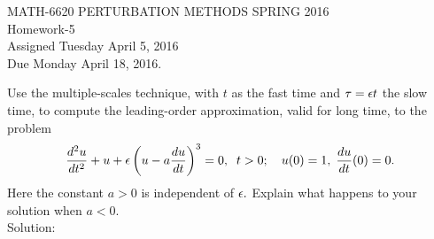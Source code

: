
\pagestyle{empty}


\begin{center}
\large{ MATH-6620 \hspace{1in}  PERTURBATION METHODS \hspace{1in}SPRING 2016\\ Homework-5 \\ Assigned Tuesday April 5, 2016 \\ Due Monday April 18, 2016.}\end{center}

\bigskip
{} \ec

\benum

\item Use the multiple-scales technique, with $t$ as the fast time and $\tau = \epsilon t$ the slow time, to compute the leading-order approximation, valid for long time, to the problem
%
\begin{equation*}
\frac{d^2u}{dt^2} + u + \epsilon \left( u-a\frac{du}{dt} \right)^3 = 0, \;\; t>0; \quad u(0)=1,\;\frac{du}{dt}(0)=0.
\end{equation*}
%
Here the constant $a>0$ is independent of $\epsilon.$  Explain what happens to your solution when $a<0.$\\

Solution:\\

